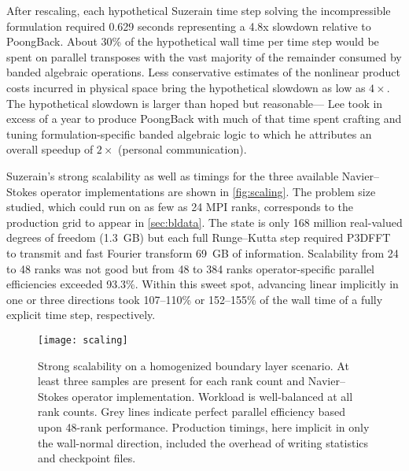 After rescaling, each hypothetical
Suzerain time step solving the incompressible \citeauthor{Kim1987Turbulence}
formulation required 0.629 seconds representing a 4.8x slowdown relative to
PoongBack.  About 30\% of the hypothetical wall time per time step would be
spent on parallel transposes with the vast majority of the remainder consumed by
banded algebraic operations.  Less conservative estimates of the nonlinear
product costs incurred in physical space bring the hypothetical slowdown as low
as $4\times$.  The hypothetical slowdown is larger than hoped but reasonable---
Lee took in excess of a year to produce PoongBack with much of that time spent
crafting and tuning formulation-specific banded algebraic logic to which he
attributes an overall speedup of $2\times$ (personal communication).

%
Suzerain's strong scalability as well as timings for the three available
Navier--Stokes operator implementations are shown in \autoref{fig:scaling}.
The problem size studied, which could run on as few as 24 MPI ranks,
corresponds to the production grid to appear in \autoref{sec:bldata}.  The state
is only 168 million real-valued degrees of freedom (1.3~GB) but each
full Runge--Kutta step required P3DFFT to transmit and fast Fourier
transform 69~GB of information.  Scalability from 24 to 48 ranks was not
good but from 48 to 384 ranks operator-specific parallel efficiencies
exceeded 93.3\%.  Within this sweet spot, advancing linear implicitly in
one or three directions took 107--110\% or 152--155\% of the wall time
of a fully explicit time step, respectively.

\begin{figure}[tb]
\centering
\texttt{[image: scaling]}
\caption[Strong scalability of Suzerain on TACC's Lonestar4 resource]{%
    Strong scalability on a homogenized boundary layer scenario.  At least three
    samples are present for each rank count and Navier--Stokes operator
    implementation.  Workload is well-balanced at all rank counts.
    Grey lines indicate perfect parallel efficiency based upon 48-rank
    performance.  Production timings, here implicit in only the
    wall-normal direction, included the overhead of writing statistics and
    checkpoint files.\label{fig:scaling}
}
\end{figure}


